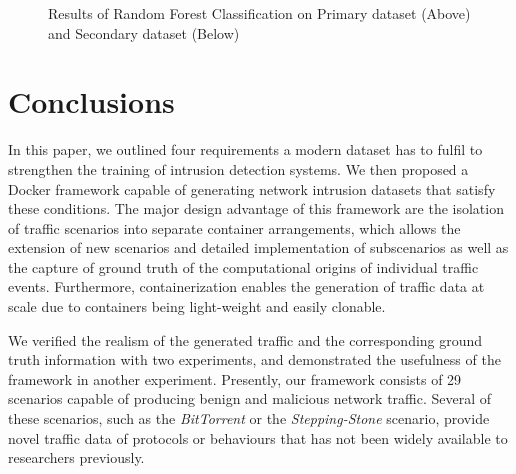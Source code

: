 \documentclass[sigconf]{acmart}
\begin{document}
\begin{figure}%



\caption{Results of Random Forest Classification on Primary dataset (Above) and Secondary dataset (Below)}
\label{Fig:Primary}
\end{figure}


\section{Conclusions}\label{Sec:Conclusion}

In this paper, we outlined four requirements a modern dataset has to fulfil to strengthen the training of intrusion detection systems. We then proposed a Docker framework capable of generating network intrusion datasets that satisfy these conditions. The major design advantage of this framework are the isolation of traffic scenarios into separate container arrangements, which allows the extension of new scenarios and detailed implementation of subscenarios as well as the capture of ground truth of the computational origins of individual traffic events. Furthermore, containerization enables the generation of traffic data at scale due to containers being light-weight and easily clonable.

We verified the realism of the generated traffic and the corresponding ground truth information with two experiments, and demonstrated the usefulness of the framework in another experiment.
Presently, our framework consists of 29 scenarios capable of producing benign and malicious network traffic. Several of these scenarios, such as the \emph{BitTorrent} or the \emph{Stepping-Stone} scenario, provide novel traffic data of protocols or behaviours that has not been widely available to researchers previously.
\end{document}
